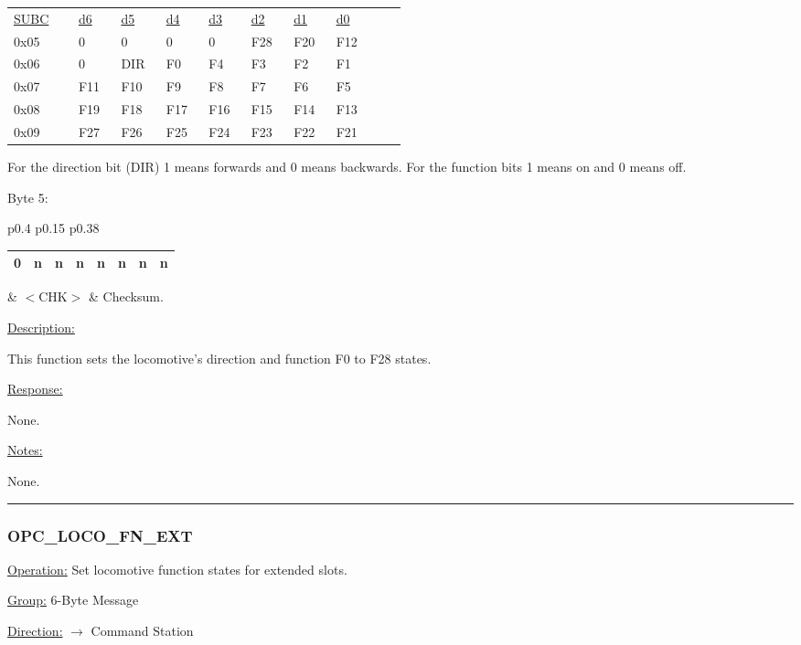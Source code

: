 \begin{tabular}{p{0.1\linewidth} p{0.05\linewidth} p{0.05\linewidth} p{0.05\linewidth} p{0.05\linewidth} p{0.05\linewidth} p{0.05\linewidth} p{0.05\linewidth} p{0.05\linewidth}} 
\underline{SUBC} & \underline{d6} & \underline{d5} & \underline{d4} & \underline{d3} & \underline{d2} & \underline{d1} & \underline{d0} \\ 
0x05 & 0 & 0 & 0 & 0 & F28 & F20 & F12\\
0x06 & 0 & DIR & F0 & F4 & F3 & F2 & F1\\ 
0x07 & F11 & F10 & F9 & F8 & F7 & F6 & F5\\
0x08 & F19 & F18 & F17 & F16 & F15 & F14 & F13\\
0x09 & F27 & F26 & F25 & F24 & F23 & F22 & F21\\
\end{tabular}

For the direction bit (DIR) 1 means forwards and 0 means backwards. For the function bits 1 means on and 0 means off.

Byte 5:

\begin{tabular}{p{0.4\linewidth} p{0.15\linewidth} p{0.38\linewidth}} 

\begin{tabular}{|p{0.3cm}|p{0.3cm}|p{0.3cm}|p{0.3cm}|p{0.3cm}|p{0.3cm}|p{0.3cm}|p{0.3cm}|}
\hline
0 & n & n & n & n & n & n & n\\
\hline
\end{tabular}
& $<$CHK$>$ & Checksum.
\end{tabular}

\underline{Description:}

This function sets the locomotive's direction and function F0 to F28 states.

\underline{Response:} 

None.

\underline{Notes:} 

None.

\rule{15.1cm}{0.4pt}
\subsubsection{OPC\_LOCO\_FN\_EXT}
\underline{Operation:} Set locomotive function states for extended slots.

\underline{Group:} \hspace{0.5cm} 6-Byte Message

\underline{Direction:} \hspace{0.05cm} $\rightarrow$ Command Station

